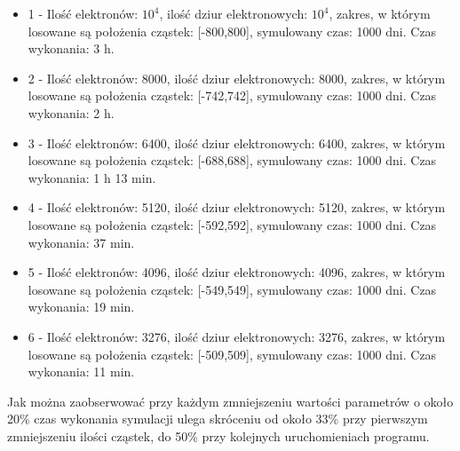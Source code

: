 \begin{itemize}
\item 1 - Ilość elektronów: $10^{4}$, ilość dziur elektronowych: $10^{4}$, zakres, w którym losowane są położenia cząstek: [-800,800], symulowany czas: 1000 dni. Czas wykonania: 3 h.
\item 2 - Ilość elektronów: 8000, ilość dziur elektronowych: 8000, zakres, w którym losowane są położenia cząstek: [-742,742], symulowany czas: 1000 dni. Czas wykonania: 2 h.
\item 3 - Ilość elektronów: 6400, ilość dziur elektronowych: 6400, zakres, w którym losowane są położenia cząstek: [-688,688], symulowany czas: 1000 dni. Czas wykonania: 1 h 13 min.
\item 4 - Ilość elektronów: 5120, ilość dziur elektronowych: 5120, zakres, w którym losowane są położenia cząstek: [-592,592], symulowany czas: 1000 dni. Czas wykonania: 37 min.
\item 5 - Ilość elektronów: 4096, ilość dziur elektronowych: 4096, zakres, w którym losowane są położenia cząstek: [-549,549], symulowany czas: 1000 dni. Czas wykonania: 19 min.
\item 6 - Ilość elektronów: 3276, ilość dziur elektronowych: 3276, zakres, w którym losowane są położenia cząstek: [-509,509], symulowany czas: 1000 dni. Czas wykonania: 11 min.

\end{itemize}

Jak można zaobserwować przy każdym zmniejszeniu wartości parametrów o około 20\% czas wykonania symulacji ulega skróceniu od około 33\% przy pierwszym zmniejszeniu ilości cząstek, do 50\% przy kolejnych uruchomieniach programu.
